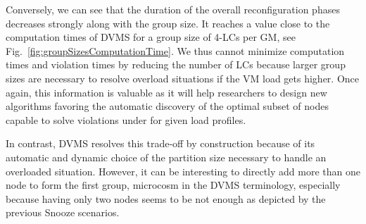 Conversely, we can see that the duration of the overall
reconfiguration phases decreases strongly along with the group
size. It reaches a value close to the computation times of DVMS for a
group size of 4-LCs per GM, see Fig.~\ref{fig:groupSizesComputationTime}.
We thus cannot minimize computation times and violation times by
reducing the number of LCs because larger group sizes are necessary to
resolve overload situations if the VM load gets higher.  Once again,
this information is valuable as it will help researchers to design new
algorithms favoring the automatic discovery of the optimal subset of
nodes capable to solve violations under for given load profiles.

In contrast, DVMS resolves this trade-off by construction because of its
automatic and dynamic choice of the partition size necessary to handle
an overloaded situation.
However, it can be interesting to directly add more than one node to
form the first group, \aka microcosm in the DVMS terminology,
especially because having only two nodes seems to be not enough as
depicted by the previous Snooze scenarios.






